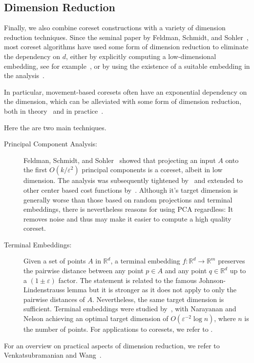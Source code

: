 \subsection{Dimension Reduction}

Finally, we also combine coreset constructions with a variety of dimension reduction techniques. Since the seminal paper by Feldman, Schmidt, and Sohler~\cite{FSS13}, most coreset algorithms have used some form of dimension reduction to eliminate the dependency on $d$, either by explicitly computing a low-dimensional embedding, see for example~\cite{FSS13,SoW18}, or by using the existence of a suitable embedding in the analysis~\cite{Cohen-AddadSS21,huang2020coresets}.

In particular, movement-based coresets often have an exponential dependency on the dimension, which can be alleviated with some form of dimension reduction, both in theory~\cite{SSS19} and in practice~\cite{KappmeierS015}.

Here the are two main techniques.

\begin{description}
\item[Principal Component Analysis:] Feldman, Schmidt, and Sohler~\cite{FSS13} showed that projecting an input $A$ onto the first $O(k/\varepsilon^2)$ principal components is a coreset, albeit in low dimension. The analysis was subsequently tightened by~\cite{CEMMP15} and extended to other center based cost functions by~\cite{SohlerW18}. Although it's target dimension is generally worse than those based on random projections and terminal embeddings, there is nevertheless reasons for using PCA regardless: It removes noise and thus may make it easier to compute a high quality coreset.
\item[Terminal Embeddings:] Given a set of points $A$ in $\mathbb{R}^d$, a terminal embedding $f:\mathbb{R}^d\rightarrow \mathbb{R}^m$ preserves the pairwise distance between any point $p\in A$ and any point $q\in \mathbb{R}^d$ up to a $(1\pm \varepsilon)$ factor. The statement is related to the famous Johnson-Lindenstrauss lemma but it is stronger as it does not apply to only the pairwise distances of $A$. Nevertheless, the same target dimension is sufficient. Terminal embeddings were studied by~\cite{ElkinFN17,MahabadiMMR18,NaN18}, with Narayanan and Nelson \cite{NaN18} achieving an optimal target dimension of $O(\varepsilon^{-2}\log n)$, where $n$ is the number of points. For applications to coresets, we refer to \cite{BecchettiBC0S19,Cohen-AddadSS21,huang2020coresets}.
\end{description}

For an overview on practical aspects of dimension reduction, we refer to Venkatsubramanian and Wang~\cite{VenkatasubramanianW11}.
